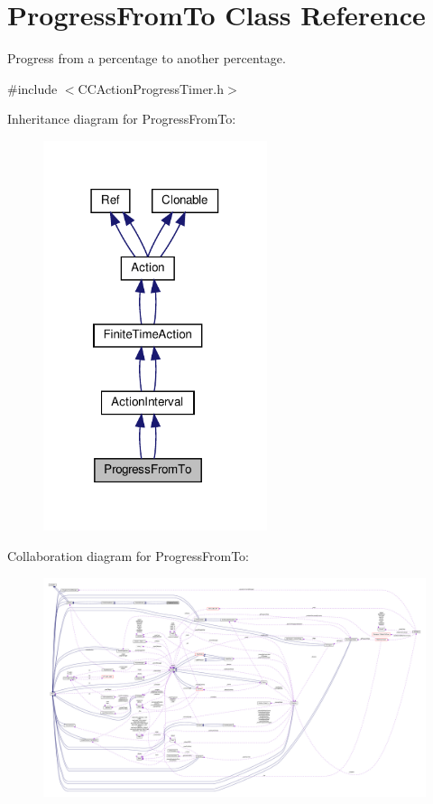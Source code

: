 \hypertarget{classProgressFromTo}{}\section{Progress\+From\+To Class Reference}
\label{classProgressFromTo}


Progress from a percentage to another percentage.  




{\ttfamily \#include $<$C\+C\+Action\+Progress\+Timer.\+h$>$}



Inheritance diagram for Progress\+From\+To\+:
\nopagebreak
\begin{figure}[H]
\begin{center}
\leavevmode
\includegraphics[width=186pt]{classProgressFromTo__inherit__graph}
\end{center}
\end{figure}


Collaboration diagram for Progress\+From\+To\+:
\nopagebreak
\begin{figure}[H]
\begin{center}
\leavevmode
\includegraphics[width=350pt]{classProgressFromTo__coll__graph}
\end{center}
\end{figure}

